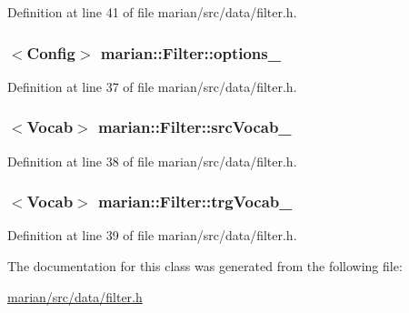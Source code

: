 Definition at line 41 of file marian/src/data/filter.\+h.

\subsubsection[{\texorpdfstring{options\+\_\+}{options_}}]{$<${\bf Config}$>$ marian\+::\+Filter\+::options\+\_\+\hspace{0.3cm}{\ttfamily [private]}}\hypertarget{classmarian_1_1Filter_a4a7ec367d7b3ca5e95021a83181a7304}{}\label{classmarian_1_1Filter_a4a7ec367d7b3ca5e95021a83181a7304}


Definition at line 37 of file marian/src/data/filter.\+h.

\subsubsection[{\texorpdfstring{src\+Vocab\+\_\+}{srcVocab_}}]{$<${\bf Vocab}$>$ marian\+::\+Filter\+::src\+Vocab\+\_\+\hspace{0.3cm}{\ttfamily [private]}}\hypertarget{classmarian_1_1Filter_a87666bc7520862fc5adb6923c59a7a98}{}\label{classmarian_1_1Filter_a87666bc7520862fc5adb6923c59a7a98}


Definition at line 38 of file marian/src/data/filter.\+h.

\subsubsection[{\texorpdfstring{trg\+Vocab\+\_\+}{trgVocab_}}]{$<${\bf Vocab}$>$ marian\+::\+Filter\+::trg\+Vocab\+\_\+\hspace{0.3cm}{\ttfamily [private]}}\hypertarget{classmarian_1_1Filter_a2003fa017c08e47172cf1f102ec0e9be}{}\label{classmarian_1_1Filter_a2003fa017c08e47172cf1f102ec0e9be}


Definition at line 39 of file marian/src/data/filter.\+h.



The documentation for this class was generated from the following file\+:\begin{DoxyCompactItemize}
\item 
\hyperlink{marian_2src_2data_2filter_8h}{marian/src/data/filter.\+h}\end{DoxyCompactItemize}
